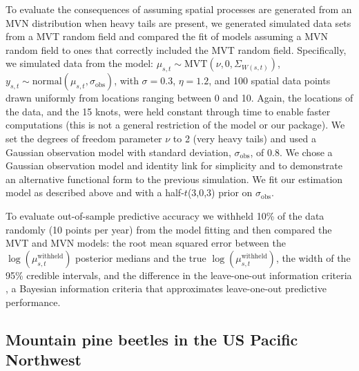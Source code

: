 \documentclass[12pt,english]{article}
\begin{document}
\begin{spacing}{1.9}
To evaluate the consequences of assuming spatial processes are generated from an
MVN distribution when heavy tails are present, we generated simulated data sets
from a MVT random field and compared the fit of models assuming a MVN random
field to ones that correctly included the MVT random field. Specifically, we
simulated data from the model:
$\mu_{s,t} \sim \mathrm{MVT}\left(\nu, 0, \Sigma_{W(s,t)}\right)$,
$y_{s,t} \sim \mathrm{normal} \left(\mu_{s,t},
  \sigma_{\mathrm{obs}} \right)$,
with $\sigma = 0.3$, $\eta = 1.2$, and 100 spatial data points drawn
uniformly from locations ranging between 0 and 10. Again, the locations of the
data, and the 15 knots, were held constant through time to enable faster
computations (this is not a general restriction of the model or our package). We
set the degrees of freedom parameter $\nu$ to 2 (very heavy tails) and used a
Gaussian observation model with standard deviation, $\sigma_{\mathrm{obs}}$, of
0.8. We chose a Gaussian observation model and identity link for simplicity and
to demonstrate an alternative functional form to the previous simulation. We
fit our estimation model as described above and with a half-$t$(3,0,3) prior
on $\sigma_{\mathrm{obs}}$.

To evaluate out-of-sample predictive accuracy we withheld
10\% of the data randomly (10 points per year)
from the model fitting and then compared
the MVT and MVN models:
the root mean squared error
between the $\log(\mu^{\mathrm{withheld}}_{s,t})$
posterior medians and the true $\log\left(\mu^{\mathrm{withheld}}_{s,t}\right)$,
the width of the 95\% credible intervals,
and the difference in the leave-one-out information criteria
\citep[LOOIC;][]{vehtari2016},
a Bayesian information criteria that approximates
leave-one-out predictive performance.

\subsection{Mountain pine beetles in the US Pacific Northwest}


\end{spacing}
\end{document}
